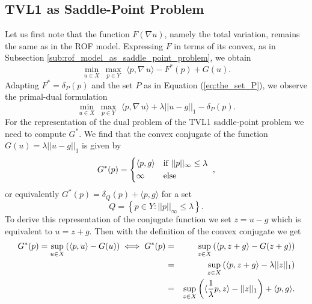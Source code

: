 \documentclass[abstracton]{scrreprt}
\begin{document}
        \subsection{TVL1 as Saddle-Point Problem} %
        \label{sub:tvl1_as_saddle_point_problem}

            Let us first note that the function $F(\nabla u)$, namely the total variation, remains the same as in the ROF model. Expressing $F$ in terms of its convex, as in Subsection \ref{sub:rof_model_as_saddle_point_problem}, we obtain
                $$
                    \min_{u \in X}\, \max_{p \in Y}\,\, \langle p, \nabla \, u \rangle - F^{\ast}(p) + G(u).
                $$
            Adapting $F^{\ast} = \delta_{P}(p)$ and the set $P$ as in Equation (\ref{eq:the_set_P}), we observe the primal-dual formulation
                $$
                    \min_{u \in X}\, \max_{p \in Y}\,\, \langle p, \nabla\, u \rangle + \lambda ||u - g||_{1} - \delta_{P}(p).
                $$
            For the representation of the dual problem of the TVL1 saddle-point problem we need to compute $G^{\ast}$. We find that the convex conjugate of the function  $G(u) = \lambda||u-g||_{1}$ is given by
                $$
                    G^{\ast}(p) =
                        \begin{dcases*}
                            \langle p, g \rangle & \textnormal{if $||p||_{\infty} \le \lambda$} \\
                            \infty & \textnormal{else}
                        \end{dcases*},
                $$
            or equivalently $G^{\ast}(p) = \delta_{Q}(p) + \langle p, g \rangle$ for a set
                $$
                    Q = \left\{ p \in Y : ||p||_{\infty} \le \lambda \right\}.
                $$
            To derive this representation of the conjugate function we set $z = u - g$ which is equivalent to $u = z + g$. Then with the definition of the convex conjugate we get
                \begin{eqnarray}
                    G^{\ast}(p) = \sup_{u \in X} \left( \langle p, u \rangle - G(u) \right) \iff G^{\ast}(p) &=& \sup_{z \in X} \left( \langle p, z + g \rangle - G(z + g) \right) \notag \\
                    &=& \sup_{z \in X} \left( \langle p, z + g \rangle - \lambda ||z||_{1} \right) \notag \\
                    &=& \sup_{z \in X} \left( \langle \frac{1}{\lambda} p, z \rangle - ||z||_{1} \right) + \langle p, g \rangle. \notag
                \end{eqnarray}
\end{document}
